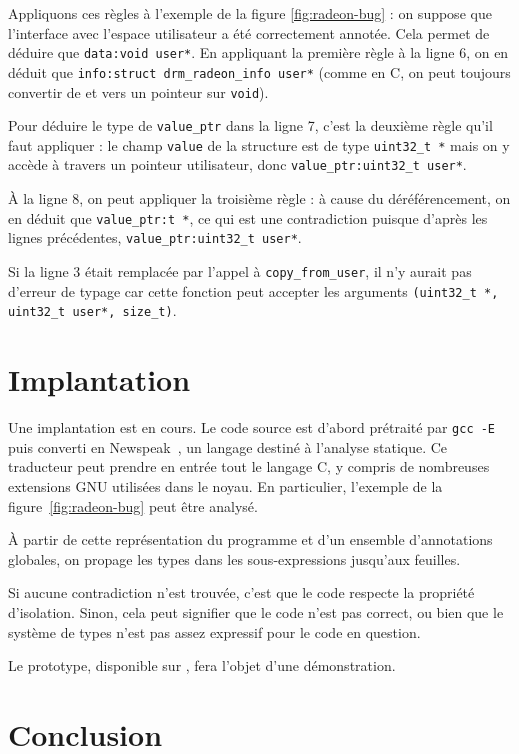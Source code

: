 Appliquons ces règles à l'exemple de la figure \ref{fig:radeon-bug} : on suppose
que l'interface avec l'espace utilisateur a été correctement annotée. Cela
permet de déduire que \texttt{data:void user*}. En appliquant la première règle
à la ligne 6, on en déduit que \texttt{info:struct drm\_radeon\_info user*}
(comme en C, on peut toujours convertir de et vers un pointeur sur
\texttt{void}).

Pour déduire le type de \texttt{value\_ptr} dans la ligne 7, c'est la
deuxième règle qu'il faut appliquer : le champ \texttt{value} de
la structure est de type \texttt{uint32\_t~*} mais on y accède à travers
un pointeur utilisateur, donc \texttt{value\_ptr:uint32\_t user*}.

À la ligne 8, on peut appliquer la troisième règle : à cause du déréférencement,
on en déduit que \texttt{value\_ptr:t *}, ce qui est une contradiction puisque
d'après les lignes précédentes, \texttt{value\_ptr:uint32\_t user*}.

Si la ligne 3 était remplacée par l'appel à \texttt{copy\_from\_user}, il n'y
aurait pas d'erreur de typage car cette fonction peut accepter les arguments
\texttt{(uint32\_t~*, uint32\_t user*, size\_t)}.

\section{Implantation}

Une implantation est en cours. Le code source est d'abord prétraité par
\texttt{gcc -E} puis converti en Newspeak~\cite{newspeak}, un langage destiné à
l'analyse statique. Ce traducteur peut prendre en entrée tout le langage C, y
compris de nombreuses extensions GNU utilisées dans le noyau. En particulier,
l'exemple de la figure~\ref{fig:radeon-bug} peut être analysé.

À partir de cette représentation du programme et d'un ensemble d'annotations
globales, on propage les types dans les sous-expressions jusqu'aux feuilles.

Si aucune contradiction n'est trouvée, c'est que le code respecte la propriété
d'isolation. Sinon, cela peut signifier que le code n'est pas correct, ou bien
que le système de types n'est pas assez expressif pour le code en question.

Le prototype, disponible sur , fera l'objet d'une démonstration.

\section{Conclusion}

